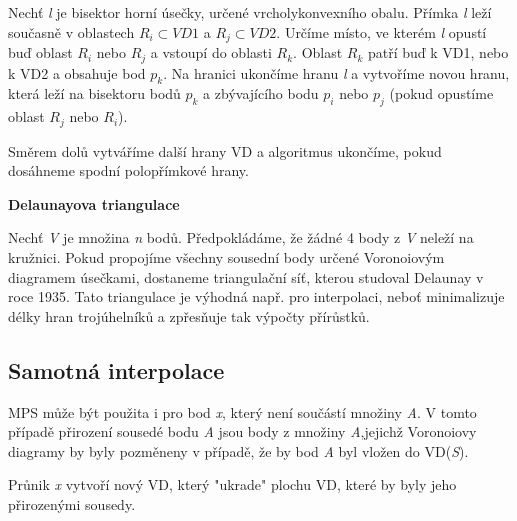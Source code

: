 \documentclass[12pt,a4paper]{article}
\begin{document}
Nechť \textit{l} je bisektor horní úsečky, určené vrcholykonvexního obalu. Přímka \textit{l} leží současně v oblastech $R_i \subset VD1$ a $R_j \subset VD2$. Určíme místo, ve kterém \textit{l} opustí buď oblast $R_i$ nebo $R_j$  a vstoupí do oblasti $R_k$. Oblast $R_k$ patří buď k VD1, nebo k VD2 a obsahuje bod $p_k$. Na hranici ukončíme hranu \textit{l} a vytvoříme novou hranu, která leží na bisektoru bodů $p_k$ a zbývajícího bodu $p_i$ nebo $p_j$ (pokud opustíme oblast $R_j$ nebo $R_i$). 

Směrem dolů vytváříme další hrany VD a algoritmus ukončíme, pokud dosáhneme spodní polopřímkové hrany.

\textbf{Delaunayova triangulace}

Nechť \textit{V} je množina \textit{n} bodů. Předpokládáme, že žádné 4 body z \textit{V} neleží na kružnici. Pokud propojíme všechny sousední body určené Voronoiovým diagramem úsečkami, dostaneme triangulační síť, kterou studoval Delaunay v roce 1935. Tato triangulace je výhodná např. pro interpolaci, neboť minimalizuje délky hran trojúhelníků a zpřesňuje tak výpočty přírůstků. 

\subsection{Samotná interpolace}
MPS může být použita i pro bod \textit{x}, který není součástí množiny \textit{A}. V tomto případě přirození sousedé bodu \textit{A} jsou body z množiny \textit{A},jejichž Voronoiovy diagramy by byly pozměneny v případě, že by bod \textit{A} byl vložen do VD(\textit{S}).

Průnik \textit{x} vytvoří nový VD, který "ukrade" plochu VD, které by byly jeho přirozenými sousedy. 
\end{document}
